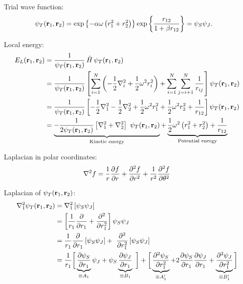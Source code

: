 \documentclass[a4paper,10pt]{article}
\newcommand{\pder}[2]{\frac{\partial #1}{\partial #2}}       %
\newcommand{\nn}{\nonumber}
\newcommand{\rv}{{\bf r}}
\begin{document}
Trial wave function:
\begin{align}
\psi_T(\rv_1,\rv_2) &= \exp\left\{-\alpha\omega\left(r_1^2 + r_2^2\right) \right\}\exp\left\{\frac{r_{12}}{1+\beta r_{12}} \right\} = \psi_S \psi_J.
\end{align}

Local energy:
\begin{align}
E_L(\rv_1,\rv_2) &= \frac{1}{\psi_T(\rv_1,\rv_2)}\,\hat{H}\,\psi_T (\rv_1,\rv_2) \nn\\
&=  \frac{1}{\psi_T(\rv_1,\rv_2)} \left[\sum_{i=1}^N\left(-\frac{1}{2}\nabla_i^2 +\frac{1}{2}\omega^2r_i^2 \right) +\sum_{i=1}^N\sum_{j=i+1}^N \frac{1}{r_{ij}} \right]\psi_T(\rv_1,\rv_2) \nn\\
&= \frac{1}{\psi_T(\rv_1,\rv_2)} \left[-\frac{1}{2}\nabla_1^2-\frac{1}{2}\nabla_2^2 +\frac{1}{2}\omega^2r_1^2+\frac{1}{2}\omega^2r_2^2  +\frac{1}{r_{12}} \right]\psi_T(\rv_1,\rv_2) \nn\\
&= \underbrace{-\frac{1}{2\psi_T(\rv_1,\rv_2)} \left[ \nabla_1^2 + \nabla_2^2\right] \psi_T(\rv_1,\rv_2)}_{\text{Kinetic energy}} + \underbrace{\frac{1}{2}\omega^2\left(r_1^2+r_2^2 \right) + \frac{1}{r_{12}}}_{\text{Potential energy}}
\end{align}

Laplacian in polar coordinates:
\begin{align}
\nabla^2f = {1 \over r} {\partial f \over \partial r}  + {\partial^2 f \over \partial r^2} + {1 \over r^2} {\partial^2 f \over \partial \theta^2}
\end{align}


Laplacian of $\psi_T(\rv_1,\rv_2)$:
\begin{align}
\nabla_1^2\psi_T(\rv_1,\rv_2) &= \nabla_1^2 \left[ \psi_S\psi_J\right] \nn\\
&=  \left[{1 \over r_1} {\partial  \over \partial r_1}  + {\partial^2 \over \partial r_1^2}\right] \psi_S\psi_J \nn\\
&=  \frac{1}{r_1}\pder{}{r_1}\left[\psi_S\psi_J\right]  +  {\partial^2 \over \partial r_1^2} \left[\psi_S\psi_J\right]\nn\\
&= \frac{1}{r_1}\bigg[\underbrace{\pder{\psi_S}{r_1}}_{\equiv A_1}\psi_J + \psi_S\underbrace{\pder{\psi_J}{r_1}}_{\equiv B_1} \bigg] + \bigg[\underbrace{\pder{^2\psi_S}{r_1^2}}_{\equiv A_1'} + 2\pder{\psi_S}{r_1}\pder{\psi_J}{r_1} + \underbrace{\pder{^2\psi_J}{r_1^2}}_{\equiv B_1'} \bigg] 
\end{align}

\noindent\makebox[\linewidth]{\rule{0.7\paperwidth}{0.4pt}}
\end{document}
